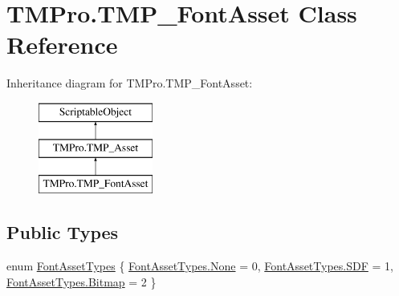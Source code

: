 \hypertarget{class_t_m_pro_1_1_t_m_p___font_asset}{}\section{T\+M\+Pro.\+T\+M\+P\+\_\+\+Font\+Asset Class Reference}
\label{class_t_m_pro_1_1_t_m_p___font_asset}
Inheritance diagram for T\+M\+Pro.\+T\+M\+P\+\_\+\+Font\+Asset\+:\begin{figure}[H]
\begin{center}
\leavevmode
\includegraphics[height=3.000000cm]{class_t_m_pro_1_1_t_m_p___font_asset}
\end{center}
\end{figure}
\subsection*{Public Types}
\begin{DoxyCompactItemize}
\item 
enum \mbox{\hyperlink{class_t_m_pro_1_1_t_m_p___font_asset_a91155d493809b47bc2a9d38ffe43fca3}{Font\+Asset\+Types}} \{ \mbox{\hyperlink{class_t_m_pro_1_1_t_m_p___font_asset_a91155d493809b47bc2a9d38ffe43fca3a6adf97f83acf6453d4a6a4b1070f3754}{Font\+Asset\+Types.\+None}} = 0, 
\mbox{\hyperlink{class_t_m_pro_1_1_t_m_p___font_asset_a91155d493809b47bc2a9d38ffe43fca3a9c0a2523f776c96bce27eeb5671371e0}{Font\+Asset\+Types.\+S\+DF}} = 1, 
\mbox{\hyperlink{class_t_m_pro_1_1_t_m_p___font_asset_a91155d493809b47bc2a9d38ffe43fca3a86ee74baff479d85d18f2cda9f8a9518}{Font\+Asset\+Types.\+Bitmap}} = 2
 \}
\end{DoxyCompactItemize}
